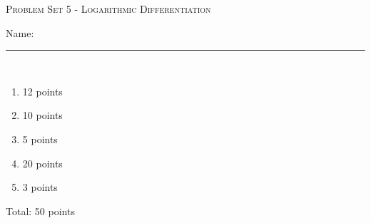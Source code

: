 \documentclass{article}
\begin{document}
\begin{center}
  \large\textsc{Problem Set 5 - Logarithmic Differentiation}
  
      \pspace{12pt}
  \begin{problemonly}\large Name: \rule{5cm}{0.15mm}\\ \end{problemonly}
\end{center}

\begin{grading}
\begin{enumerate}
    \item 12 points
    \item 10 points
    \item 5 points
    \item 20 points
    \item 3 points
\end{enumerate}
Total: 50 points
\end{grading}


\end{document}
